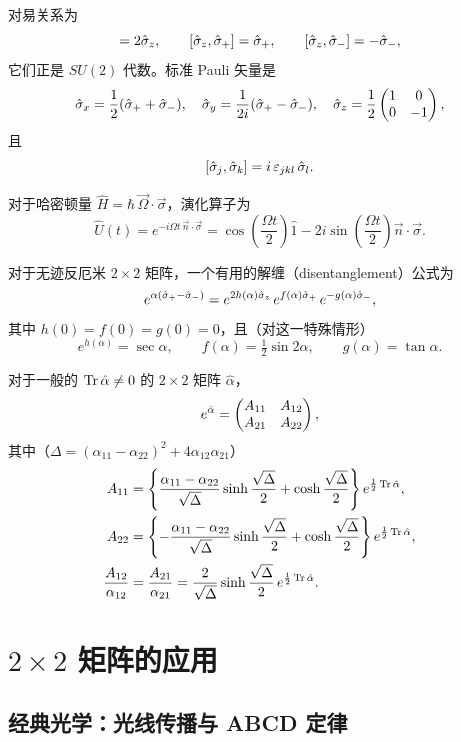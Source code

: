 对易关系为
\begin{equation}
[\spp,\smm] = 2\sigz,\qquad
[\sigz,\spp] = \spp,\qquad
[\sigz,\smm] = -\smm,
\label{eq:1.2.8}
\end{equation}
它们正是 $SU(2)$ 代数。标准 Pauli 矢量是
\[
\hat{\sigma}_{x} = \frac{1}{2}(\hat{\sigma}_{+}+\hat{\sigma}_{-}),\quad
\hat{\sigma}_{y} = \frac{1}{2i}(\hat{\sigma}_{+}-\hat{\sigma}_{-}),\quad
\hat{\sigma}_{z} = \frac{1}{2}\begin{pmatrix}1 & 0 \\ 0 & -1\end{pmatrix},
\]
且
\[
[\hat{\sigma}_{j},\hat{\sigma}_{k}] = i\,\varepsilon_{jkl}\,\hat{\sigma}_{l}.
\]

对于哈密顿量 $\hat{H} = \hbar\,\vec{\Omega}\!\cdot\!\vec{\sigma}$，演化算子为
\[
\hat{U}(t) = e^{-i\Omega t\,\vec{n}\!\cdot\!\vec{\sigma}}
= \cos\!\left(\frac{\Omega t}{2}\right)\hat{1}
- 2i\sin\!\left(\frac{\Omega t}{2}\right)\vec{n}\!\cdot\!\vec{\sigma}.
\]

对于无迹反厄米 $2\times 2$ 矩阵，一个有用的解缠（disentanglement）公式为
\[
e^{\alpha(\hat{\sigma}_{+}-\hat{\sigma}_{-})}
= e^{2h(\alpha)\hat{\sigma}_{z}}\,e^{f(\alpha)\hat{\sigma}_{+}}\,e^{-g(\alpha)\hat{\sigma}_{-}},
\]
其中 $h(0)=f(0)=g(0)=0$，且（对这一特殊情形）
\[
e^{h(\alpha)} = \sec\alpha,\qquad
f(\alpha) = \tfrac{1}{2}\sin 2\alpha,\qquad
g(\alpha) = \tan\alpha.
\]

对于一般的 $\operatorname{Tr}\hat{\alpha}\neq 0$ 的 $2\times 2$ 矩阵 $\hat{\alpha}$，
\[
e^{\hat{\alpha}} = \begin{pmatrix}A_{11} & A_{12} \\ A_{21} & A_{22}\end{pmatrix},
\]
其中（$\Delta = (\alpha_{11}-\alpha_{22})^{2}+4\alpha_{12}\alpha_{21}$）
\begin{align*}
A_{11} &= \left\{\frac{\alpha_{11}-\alpha_{22}}{\sqrt{\Delta}}\sinh\frac{\sqrt{\Delta}}{2}
           + \cosh\frac{\sqrt{\Delta}}{2}\right\}e^{\frac{1}{2}\operatorname{Tr}\hat{\alpha}},\\
A_{22} &= \left\{-\frac{\alpha_{11}-\alpha_{22}}{\sqrt{\Delta}}\sinh\frac{\sqrt{\Delta}}{2}
           + \cosh\frac{\sqrt{\Delta}}{2}\right\}e^{\frac{1}{2}\operatorname{Tr}\hat{\alpha}},\\
\frac{A_{12}}{\alpha_{12}} &= \frac{A_{21}}{\alpha_{21}}
 = \frac{2}{\sqrt{\Delta}}\sinh\frac{\sqrt{\Delta}}{2}\,e^{\frac{1}{2}\operatorname{Tr}\hat{\alpha}}.
\end{align*}

\section{\texorpdfstring{$2\times 2$}{2x2} 矩阵的应用}
\label{sec:1.3}

\subsection{经典光学：光线传播与 ABCD 定律}

